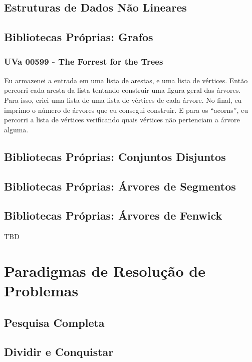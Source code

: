 \documentclass[11pt]{scrartcl}
\begin{document}
\subsection{Estruturas de Dados Não Lineares}

\subsection{Bibliotecas Próprias: Grafos}
\subsubsection{UVa 00599 - The Forrest for the Trees}
Eu armazenei a entrada em uma lista de arestas, e uma lista de vértices. Então percorri cada aresta da lista tentando construir uma figura geral das árvores. Para isso, criei uma lista de uma lista de vértices de cada árvore. No final, eu imprimo o número de árvores que eu consegui construir. E para os ``acorns'', eu percorri a lista de vértices verificando quais vértices não pertenciam a árvore alguma.


\subsection{Bibliotecas Próprias: Conjuntos Disjuntos}

\subsection{Bibliotecas Próprias: Árvores de Segmentos}

\subsection{Bibliotecas Próprias: Árvores de Fenwick}

TBD

\section{Paradigmas de Resolução de Problemas}

\subsection{Pesquisa Completa}

\subsection{Dividir e Conquistar}
\end{document}
